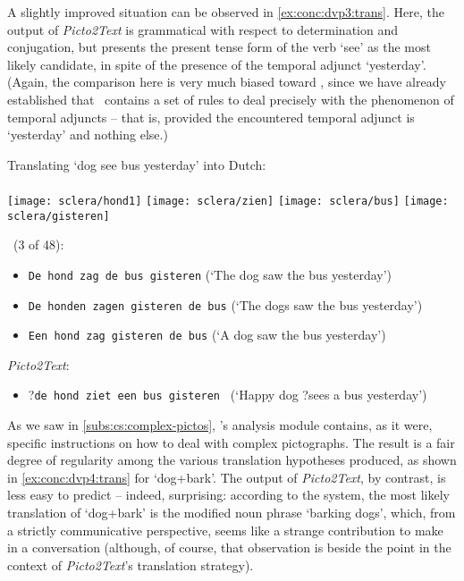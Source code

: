 A slightly improved situation can be observed in \cref{ex:conc:dvp3:trans}.
Here, the output of \emph{Picto2Text} is grammatical with respect to
determination and conjugation, but presents the present tense form of the verb
`see' as the most likely candidate, in spite of the presence of the temporal
adjunct `yesterday'. (Again, the comparison here is very much biased toward
\depicto, since we have already established that \depicto\ contains a set of
rules to deal precisely with the phenomenon of temporal adjuncts -- that is, provided the encountered temporal adjunct is `yesterday' and nothing else.)

\begin{exe}
    \ex \label{ex:conc:dvp3:trans} Translating `dog see bus yesterday' into Dutch: \\\\
     {\texttt{[image: sclera/hond1]}\hspace{0.5cm}}
     {\texttt{[image: sclera/zien]}\hspace{0.5cm}}
     {\texttt{[image: sclera/bus]}\hspace{0.5cm}}
     {\texttt{[image: sclera/gisteren]}\hspace{0.5cm}}
    \begin{xlist}
        \ex \depicto\ (3 of 48):
            \begin{itemize}
                \item \texttt{De hond zag de bus gisteren} (`The dog saw the bus yesterday')
                \item \texttt{De honden zagen gisteren de bus} (`The dogs saw the bus yesterday')
                \item \texttt{Een hond zag gisteren de bus} (`A dog saw the bus yesterday')
            \end{itemize}
        \ex \emph{Picto2Text}:
            \begin{itemize}
                \item ?\texttt{de hond ziet een bus gisteren } (`Happy dog
                                ?sees a bus yesterday')
            \end{itemize}
    \end{xlist}
\end{exe}

As we saw in \cref{subs:cs:complex-pictos}, \depicto's analysis module
contains, as it were, specific instructions on how to deal with complex
pictographs. The result is a fair degree of regularity among the various
translation hypotheses produced, as shown in \cref{ex:conc:dvp4:trans} for
`dog+bark'. The output of \emph{Picto2Text}, by contrast, is less easy to
predict -- indeed, surprising: according to the system, the most likely
translation of `dog+bark' is the modified noun phrase `barking dogs', which,
from a strictly communicative perspective, seems like a strange contribution to
make in a conversation (although, of course, that observation is beside the
point in the context of \emph{Picto2Text}'s translation strategy).

